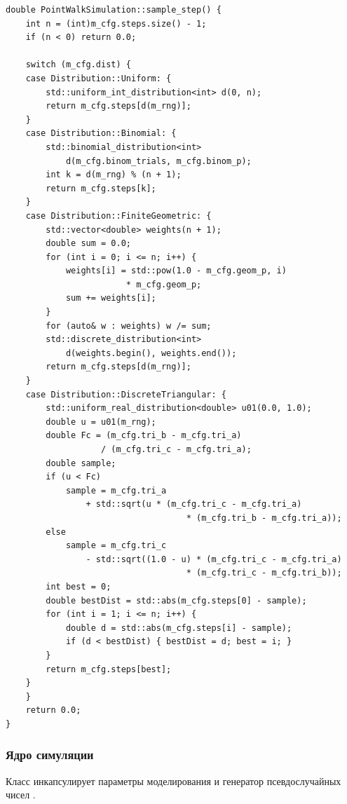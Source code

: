 \documentclass[14pt]{extarticle}
\renewcommand{\texttt}[1]{{\codefont \seqsplit{#1}}}
\begin{document}
\begin{listing}[htbp]
\caption{Генерация случайного шага}
\begin{verbatim}
double PointWalkSimulation::sample_step() {
    int n = (int)m_cfg.steps.size() - 1;
    if (n < 0) return 0.0;

    switch (m_cfg.dist) {
    case Distribution::Uniform: {
        std::uniform_int_distribution<int> d(0, n);
        return m_cfg.steps[d(m_rng)];
    }
    case Distribution::Binomial: {
        std::binomial_distribution<int>
            d(m_cfg.binom_trials, m_cfg.binom_p);
        int k = d(m_rng) % (n + 1);
        return m_cfg.steps[k];
    }
    case Distribution::FiniteGeometric: {
        std::vector<double> weights(n + 1);
        double sum = 0.0;
        for (int i = 0; i <= n; i++) {
            weights[i] = std::pow(1.0 - m_cfg.geom_p, i)
                        * m_cfg.geom_p;
            sum += weights[i];
        }
        for (auto& w : weights) w /= sum;
        std::discrete_distribution<int>
            d(weights.begin(), weights.end());
        return m_cfg.steps[d(m_rng)];
    }
    case Distribution::DiscreteTriangular: {
        std::uniform_real_distribution<double> u01(0.0, 1.0);
        double u = u01(m_rng);
        double Fc = (m_cfg.tri_b - m_cfg.tri_a)
                   / (m_cfg.tri_c - m_cfg.tri_a);
        double sample;
        if (u < Fc)
            sample = m_cfg.tri_a
                + std::sqrt(u * (m_cfg.tri_c - m_cfg.tri_a)
                                    * (m_cfg.tri_b - m_cfg.tri_a));
        else
            sample = m_cfg.tri_c
                - std::sqrt((1.0 - u) * (m_cfg.tri_c - m_cfg.tri_a)
                                    * (m_cfg.tri_c - m_cfg.tri_b));
        int best = 0;
        double bestDist = std::abs(m_cfg.steps[0] - sample);
        for (int i = 1; i <= n; i++) {
            double d = std::abs(m_cfg.steps[i] - sample);
            if (d < bestDist) { bestDist = d; best = i; }
        }
        return m_cfg.steps[best];
    }
    }
    return 0.0;
}
\end{verbatim}
\end{listing}
\subsubsection{Ядро симуляции}
\label{sec:org4be7577}

Класс \texttt{PointWalkSimulation} инкапсулирует параметры моделирования и генератор псевдослучайных чисел \texttt{std::mt19937}.
\end{document}
